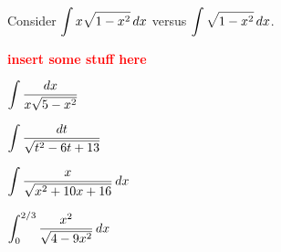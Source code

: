 \documentclass[12pt]{article}
\begin{document}
\newpage

\Example Consider $\displaystyle\int x\sqrt{1-x^2}\,dx$ versus $\displaystyle\int\sqrt{1-x^2}\,dx$.

\textbf{\textcolor{red}{insert some stuff here}}

\newpage

\Example $\displaystyle\int\frac{dx}{x\sqrt{5-x^2}}$

\newpage

\Example $\displaystyle\int\frac{dt}{\sqrt{t^2-6t+13}}$

\newpage

\Example $\displaystyle\int\frac{x}{\sqrt{x^2+10x+16}}\,dx$

\newpage

\Example $\displaystyle\int_0^{2/3}\frac{x^2}{\sqrt{4-9x^2}}\,dx$
\end{document}
